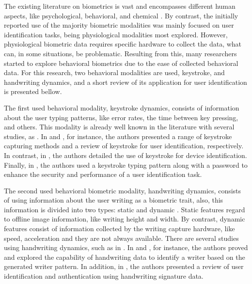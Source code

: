 \documentclass[conference]{IEEEtran}
\begin{document}
The existing literature on biometrics is vast and encompasses different human aspects, like psychological, behavioral, and chemical \cite{handbook-biometrics} \cite{handbook-biometrics}. By contrast, the initially reported use of the majority biometric modalities was mainly focused on user identification tasks, being physiological modalities most explored. However,  physiological biometric data requires specific hardware to collect the data, what can, in some situations, be problematic. Resulting from this, many researchers started to explore behavioral biometrics due to the ease of collected behavioral data. For this research, two behavioral modalities are used, keystroke, and handwriting dynamics, and a short review of its application for user identification is presented bellow.

The first used behavioral modality, keystroke dynamics, consists of information about the user typing patterns, like error rates, the time between key pressing, and others. This modality is already well known in the literature with several studies, as \cite{ks-methods,ks-review-ident,ks-id-device,ks-hardenning}. In \cite{ks-methods} and \cite{ks-review-ident}, for instance, the authors presented a range of keystroke capturing methods and a review of keystroke for user identification, respectively. In contrast, in \cite{ks-id-device}, the authors detailed the use of keystroke for device identification. Finally, in \cite{ks-hardenning}, the authors used a keystroke typing pattern along with a password to enhance the security and performance of a user identification task.

The second used behavioral biometric modality, handwriting dynamics, consists of using information about the user writing as a biometric trait, also, this information is divided into two types: static and dynamic \cite{hw-recognition}. Static features regard to offline image information, like writing height and width. By contrast, dynamic features consist of information collected by the writing capture hardware, like speed, acceleration and they are not always available. 
There are several studies using handwriting dynamics, such as in \cite{hw-individuality,hw-writer-id,hw-recognition}. In \cite{hw-individuality} and \cite{hw-writer-id}, for instance, the authors proved and explored the capability of handwriting data to identify a writer based on the generated writer pattern. In addition, in \cite{hw-recognition}, the authors presented a review of user identification and authentication using handwriting signature data.
\end{document}

